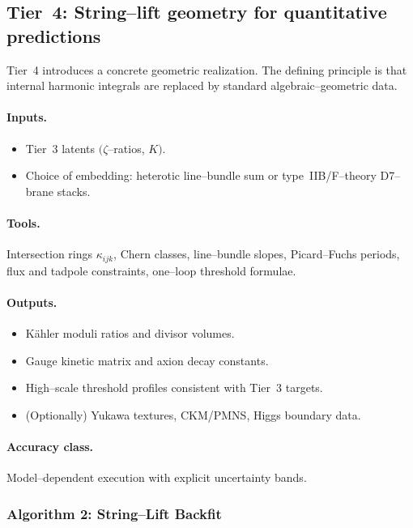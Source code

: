 \documentclass[11pt]{article}
\begin{document}
\subsection{Tier~4: String--lift geometry for quantitative predictions}

Tier~4 introduces a concrete geometric realization.
The defining principle is that internal harmonic integrals are replaced
by standard algebraic--geometric data.

\paragraph{Inputs.}
\begin{itemize}
  \item Tier~3 latents $(\zeta$--ratios, $K)$.
  \item Choice of embedding: heterotic line--bundle sum or
        type~IIB/F--theory D7--brane stacks.
\end{itemize}

\paragraph{Tools.}
Intersection rings $\kappa_{ijk}$, Chern classes, line--bundle slopes,
Picard--Fuchs periods, flux and tadpole constraints, one--loop threshold
formulae.

\paragraph{Outputs.}
\begin{itemize}
  \item K\"ahler moduli ratios and divisor volumes.
  \item Gauge kinetic matrix and axion decay constants.
  \item High--scale threshold profiles consistent with Tier~3 targets.
  \item (Optionally) Yukawa textures, CKM/PMNS, Higgs boundary data.
\end{itemize}

\paragraph{Accuracy class.}
Model--dependent execution with explicit uncertainty bands.

\subsubsection{Algorithm 2: String--Lift Backfit}
\end{document}
